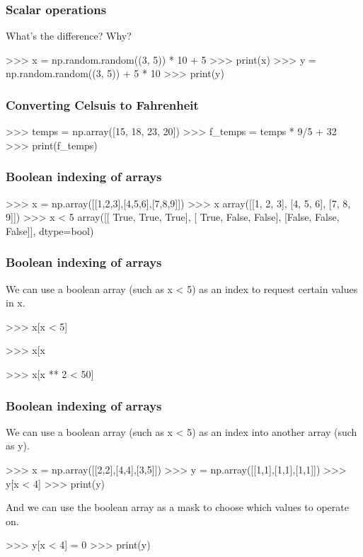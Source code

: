 \documentclass{beamer}
\begin{document}
\begin{frame}[fragile]
\frametitle{Scalar operations}
What's the difference? Why?
\begin{code}
>>> x = np.random.random((3, 5)) * 10 + 5
>>> print(x)
>>> y = np.random.random((3, 5)) + 5 * 10
>>> print(y)
\end{code}
\end{frame}

\begin{frame}[fragile]
\frametitle{Converting Celsuis to Fahrenheit}
\begin{code}
>>> temps = np.array([15, 18, 23, 20])
>>> f_temps = temps * 9/5 + 32
>>> print(f_temps)
\end{code}
\end{frame}



\begin{frame}[fragile]
\frametitle{Boolean indexing of arrays}
\begin{code}
>>> x = np.array([[1,2,3],[4,5,6],[7,8,9]])
>>> x
array([[1, 2, 3],
       [4, 5, 6],
       [7, 8, 9]])
>>> x < 5
array([[ True,  True,  True],
       [ True, False, False],
       [False, False, False]], dtype=bool)
\end{code}
\end{frame}

\begin{frame}[fragile]
\frametitle{Boolean indexing of arrays}
We can use a boolean array (such as x < 5) as an index to request
certain values in x.
\begin{code}
>>> x[x < 5]

>>> x[x %

>>> x[x ** 2 < 50]
\end{code}
\end{frame}

\begin{frame}[fragile]
\frametitle{Boolean indexing of arrays}
We can use a boolean array (such as x < 5) as an index into another
array (such as y).
\begin{code}
>>> x = np.array([[2,2],[4,4],[3,5]])
>>> y = np.array([[1,1],[1,1],[1,1]])
>>> y[x < 4]
>>> print(y)
\end{code}

And we can use the boolean array as a mask to choose which values to
operate on.
\begin{code}
>>> y[x < 4] = 0
>>> print(y)
\end{code}
\end{frame}
\end{document}
